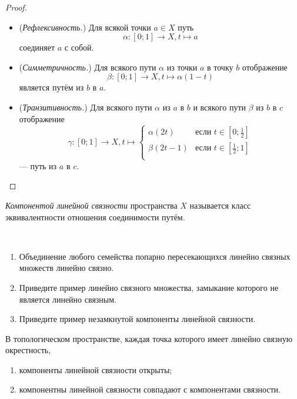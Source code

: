 \documentclass[12pt,a4paper]{article}
\begin{document}
    \begin{proof}
        \begin{itemize}
            \item (\emph{Рефлексивность.}) Для всякой точки $a \in X$ путь \[\alpha: [0; 1] \to X, t \mapsto a\] соединяет $a$ с собой.
            \item (\emph{Симметричность.}) Для всякого пути $\alpha$ из точки $a$ в точку $b$ отображение \[\beta: [0; 1] \to X, t \mapsto \alpha(1 - t)\] является путём из $b$ в $a$.
            \item (\emph{Транзитивность.}) Для всякого пути $\alpha$ из $a$ в $b$ и всякого пути $\beta$ из $b$ в $c$ отображение
                \[\gamma: [0; 1] \to X, t \mapsto
                    \begin{cases}
                        \alpha(2t)& \text{если $t \in [0; \frac{1}{2}]$}\\
                        \beta(2t-1)& \text{если $t \in [\frac{1}{2}; 1]$}\\
                    \end{cases}
                \]
                --- путь из $a$ в $c$.
        \end{itemize}
    \end{proof}

    \begin{definition}
        \emph{Компонентой линейной связности} пространства $X$ называется класс эквивалентности отношения соединимости путём.
    \end{definition}

    \begin{exercise}\ 
        \begin{enumerate}
            \item Объединение любого семейства попарно пересекающихся линейно связных множеств линейно связно.
            \item Приведите пример линейно связного множества, замыкание которого не является линейно связным.
            \item Приведите пример незамкнутой компоненты линейной связности.
        \end{enumerate}
    \end{exercise}

    \begin{theorem}
        В топологическом пространстве, каждая точка которого имеет линейно связную окрестность,
        \begin{enumerate}
            \item компоненты линейной связности открыты;
            \item компонентны линейной связности совпадают с компонентами связности.
        \end{enumerate}
    \end{theorem}
\end{document}

